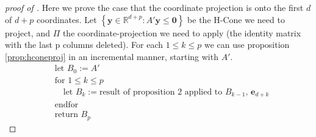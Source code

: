\documentclass[fleqn]{article}
\renewcommand{\vec}[1]{\mathbf{#1}}
\newcommand{\set}[1]{\left\{#1\right\}}
\newcommand{\R}{\mathbb{R}}
\newcommand{\0}{\vec{0}}
\newcommand{\y}{\vec{y}}
\newcommand{\e}{\vec{e}}
\newcommand{\Udim}{p}
\begin{document}
\begin{proof}[proof of \Vproj]
  Here we prove the case that the coordinate projection is onto the first $d$ of $d+p$ coordinates.  Let $\set{\y\in\R^{d+\Udim}:A'\y \leq \0}$ be the H-Cone we need to project, and $\Pi$ the coordinate-projection we need to apply (the identity matrix with the last p columns deleted).  For each $1 \leq k \leq p$ we can use proposition \ref{prop:hconeproj} in an incremental manner, starting with $A'$.
\begin{align*}
  &\text{let } B_0 := A'\\
  &\text{for } 1 \leq k \leq p \\
  &\quad \text{let } B_k := 
         \text{result of proposition 2 applied to $B_{k-1}$, $\e_{d+k}$} \\
  &\text{endfor} \\
  &\text{return } B_p
\end{align*}



\end{proof}
\end{document}

